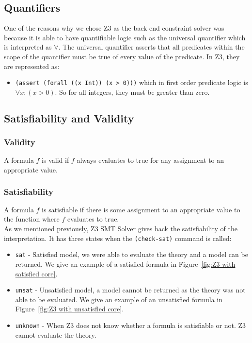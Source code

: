 \documentclass[a4paper]{report}
\begin{document}
\subsection{Quantifiers}
One of the reasons why we chose Z3 as the back end constraint solver was because it is able to have quantifiable logic such as the universal quantifier which is interpreted as  $\forall$. The universal quantifier asserts that all predicates within the scope of the quantifier must be true of every value of the predicate. In Z3, they are represented as:
\begin{itemize}
\item \texttt{(assert (forall ((x Int)) (x > 0)))} which in first order predicate logic is $\forall x: (x > 0)$. So for all integers, they must be greater than zero.
\end{itemize}

\subsection{Satisfiability and Validity}
\subsubsection{Validity}
A formula $f$ is valid if $f$ always evaluates to true for any assignment to an appropriate value. \\

\subsubsection{Satisfiability}
A formula $f$ is satisfiable if there is some assignment to an appropriate value to the function where $f$ evaluates to true.\\

As we mentioned previously, Z3 SMT Solver gives back the satisfiability of the interpretation. It has three states when the \texttt{(check-sat)} command is called:
\begin{itemize}
\item \texttt{sat} - Satisfied model, we were able to evaluate the theory and a model can be returned. We give an example of a satisfied formula in Figure~\ref{fig:Z3 with satisfied core}.
\item \texttt{unsat} - Unsatisfied model, a model cannot be returned as the theory was not able to be evaluated. We give an example of an unsatisfied formula in Figure~\ref{fig:Z3 with unsatisfied core}.
\item \texttt{unknown} - When Z3 does not know whether a formula is satisfiable or not. Z3 cannot evaluate the theory.
\end{itemize}
\end{document}
